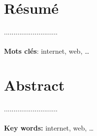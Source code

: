 \section*{Résumé}
............................
\paragraph{}

\textbf{Mots clés}: internet, web, \ldots

\section*{Abstract}
............................
\paragraph{}
\textbf{Key words:} internet, web, \ldots